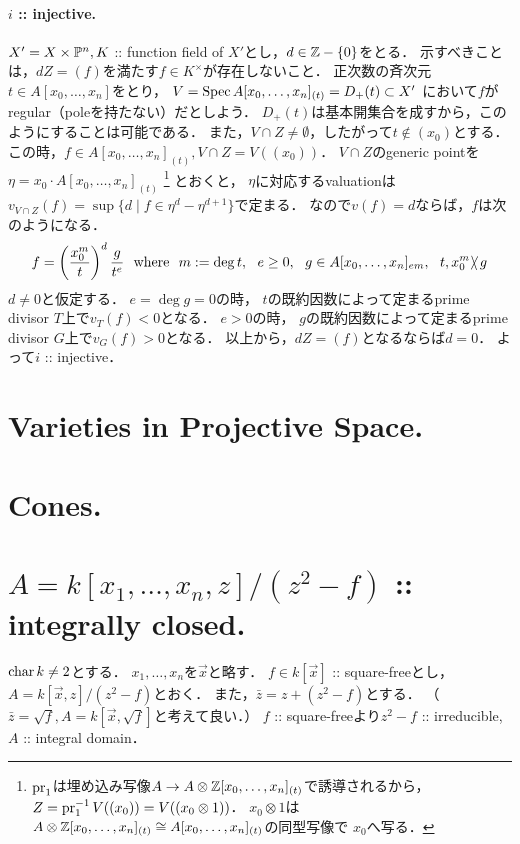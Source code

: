 \documentclass[a4paper]{jsarticle}
\begin{document}
    \paragraph{$i$ :: injective.}
    $X'=X \times \mathbb{P}^n, K$ :: function field of $X'$とし，$d \in \mathbb{Z}-\{0\}$をとる．
    示すべきことは，$dZ=(f)$を満たす$f \in K^{\times}$が存在しないこと．
    正次数の斉次元$t \in A[x_0,\dots,x_n]$をとり，
    $V=\operatorname{Spec} A[x_0,\dots,x_n]_{(t)}=D_+(t) \subset X'$
    において$f$がregular（poleを持たない）だとしよう．
    $D_+(t)$は基本開集合を成すから，このようにすることは可能である．
    また，$V \cap Z \neq \emptyset$，したがって$t \not \in (x_0)$とする．
    この時，$f \in A[x_0,\dots,x_n]_{(t)}, V \cap Z=V((x_0))$．
    $V \cap Z$のgeneric pointを$\eta=x_0 \cdot A[x_0,\dots,x_n]_{(t)}$
    \footnote
        {
            $\operatorname{pr}_1$は埋め込み写像$A \to A \otimes \mathbb{Z}[x_0,\dots,x_n]_{(t)}$で誘導されるから，
            $Z=\operatorname{pr}_1^{-1}V((x_0))=V((x_0 \otimes 1))$．
            $x_0 \otimes 1$は$A \otimes \mathbb{Z}[x_0,\dots,x_n]_{(t)} \cong A[x_0,\dots,x_n]_{(t)}$の同型写像で
            $x_0$へ写る．
        }
    とおくと，
    $\eta$に対応するvaluationは
    $v_{V \cap Z}(f)=\sup \{d \mid f \in \eta^d-\eta^{d+1} \}$で定まる．
    なので$v(f)=d$ならば，$f$は次のようになる．
    \[
        f=\left(\frac{x_0^m}{t}\right)^d \frac{g}{t^e}
        ~~\text{where}~~
        m:=\deg t,~~ e \geq 0,~~ g \in A[x_0,\dots,x_n]_{em},~~ t, x_0^m \!\!\not\!\backslash\, g
    \]
    $d \neq 0$と仮定する．
    $e=\deg g=0$の時，
    $t$の既約因数によって定まるprime divisor $T$上で$v_T(f)<0$となる．
    $e>0$の時，
    $g$の既約因数によって定まるprime divisor $G$上で$v_G(f)>0$となる．
    以上から，$dZ=(f)$となるならば$d=0$．
    よって$i$ :: injective．

\section{Varieties in Projective Space.} %

\section{Cones.} %

\section{$A=k[x_1,\dots,x_n,z]/(z^2-f)$ :: integrally closed.} %
    $\operatorname{char} k \neq 2$とする．
    $x_1,\dots,x_n$を$\vec{x}$と略す．
    $f \in k[\vec{x}]$ :: square-freeとし，
    $A=k[\vec{x},z]/(z^2-f)$とおく．
    また，$\bar{z}=z+(z^2-f)$とする．
    （$\bar{z}=\sqrt{f}, A=k[\vec{x}, \sqrt{f}]$と考えて良い．）
    $f$ :: square-freeより$z^2-f$ :: irreducible, $A$ :: integral domain．
\end{document}
